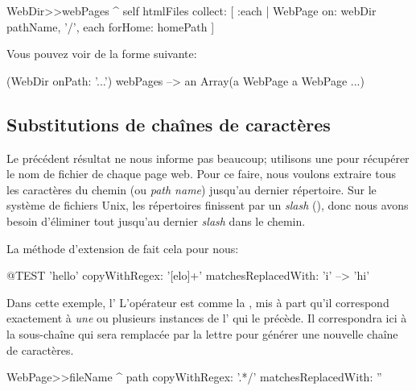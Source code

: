 \documentclass[a4paper,10pt,twoside]{book}
\begin{document}
\begin{code}{}
WebDir>>webPages
	^ self htmlFiles collect: 
		[ :each | WebPage 
			on: webDir pathName, '/', each
			forHome: homePath ]
\end{code}

Vous pouvez voir de la forme suivante:

\begin{code}{}
(WebDir onPath: '...') webPages --> an Array(a WebPage a WebPage ...)
\end{code}

\subsection{Substitutions de chaînes de caractères}

Le précédent résultat ne nous informe pas beaucoup; utilisons une
\expreg pour récupérer le nom de fichier de chaque page web.
Pour ce faire, nous voulons extraire tous les caractères du chemin (ou
\emph{path name}) jusqu'au dernier répertoire. Sur le système de
fichiers Unix, les répertoires finissent par un \emph{slash} (\ct{/}),
donc nous avons besoin d'éliminer tout jusqu'au dernier \emph{slash}
dans le chemin.

La méthode d'extension de 
 fait cela pour
nous:

\begin{code}{@TEST}
'hello' copyWithRegex: '[elo]+' matchesReplacedWith: 'i' --> 'hi'
\end{code}

Dans cette exemple, l'\expreg \ct{[elo]}  %
L'opérateur \ct{+} est comme la \kleenestar, mis à part qu'il
correspond exactement à \emph{une} ou plusieurs instances de l'\expreg
qui le précède. Il correspondra ici à la sous-chaîne  qui
sera remplacée par la lettre  pour générer une nouvelle chaîne de
caractères.


\begin{code}{}
WebPage>>fileName
	^ path copyWithRegex: '.*/' matchesReplacedWith: ''
\end{code}
\end{document}
